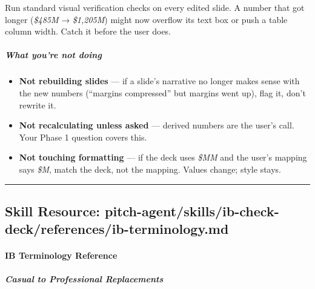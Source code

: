 \documentclass[11pt]{article}
\begin{document}
Run standard visual verification checks on every edited slide. A number that got longer (\emph{\$485M} → \emph{\$1,205M}) might now overflow its text box or push a table column width. Catch it before the user does.


\subparagraph{What you're not doing}\mbox{}\par

\begin{itemize}[leftmargin=*,itemsep=2pt,topsep=2pt]
\item {} \textbf{Not rebuilding slides} — if a slide's narrative no longer makes sense with the new numbers (``margins compressed'' but margins went up), flag it, don't rewrite it.
\item {} \textbf{Not recalculating unless asked} — derived numbers are the user's call. Your Phase 1 question covers this.
\item {} \textbf{Not touching formatting} — if the deck uses \emph{\$MM} and the user's mapping says \emph{\$M}, match the deck, not the mapping. Values change; style stays.
\end{itemize}

\vspace{0.8em}\hrule\vspace{0.8em}

\subsection{Skill Resource: pitch-agent/skills/ib-check-deck/references/ib-terminology.md}\label{file:pitch-agent-skills-ib-check-deck-references-ib-terminology-md}

\paragraph{IB Terminology Reference}\mbox{}\par

\subparagraph{Casual to Professional Replacements}\mbox{}\par
\end{document}
